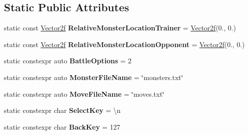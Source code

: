 \subsection*{Static Public Attributes}
\begin{DoxyCompactItemize}
\item 
\mbox{\label{classmonsterbattle_1_1Game_a33ed68f02725225009d1b60446c8f37b}} 
static const \hyperlink{structmonsterbattle_1_1Vector}{Vector2f} {\bfseries Relative\+Monster\+Location\+Trainer} = \hyperlink{structmonsterbattle_1_1Vector}{Vector2f}(0., 0.)
\item 
\mbox{\label{classmonsterbattle_1_1Game_a98d629791b00c30784c6758ee5731107}} 
static const \hyperlink{structmonsterbattle_1_1Vector}{Vector2f} {\bfseries Relative\+Monster\+Location\+Opponent} = \hyperlink{structmonsterbattle_1_1Vector}{Vector2f}(0., 0.)
\item 
\mbox{\label{classmonsterbattle_1_1Game_ac75cdf46cce2128496be11a9b20423db}} 
static constexpr auto {\bfseries Battle\+Options} = 2
\item 
\mbox{\label{classmonsterbattle_1_1Game_aa03725db1378248045a366c0d51dfaa4}} 
static constexpr auto {\bfseries Monster\+File\+Name} = \char`\"{}monsters.\+txt\char`\"{}
\item 
\mbox{\label{classmonsterbattle_1_1Game_aed8f38be766c2d9cc4fb690836cb1976}} 
static constexpr auto {\bfseries Move\+File\+Name} = \char`\"{}moves.\+txt\char`\"{}
\item 
\mbox{\label{classmonsterbattle_1_1Game_ada428f88079d8a130596adb6df96cf0e}} 
static constexpr char {\bfseries Select\+Key} = \textquotesingle{}\textbackslash{}n\textquotesingle{}
\item 
\mbox{\label{classmonsterbattle_1_1Game_a1fabd07e670fa98759ba6ec4b1908c92}} 
static constexpr char {\bfseries Back\+Key} = 127
\item 
\mbox{\label{classmonsterbattle_1_1Game_a8c2e4578e0e6ec21299b16b65ae3f287}} 

\end{DoxyCompactItemize}
